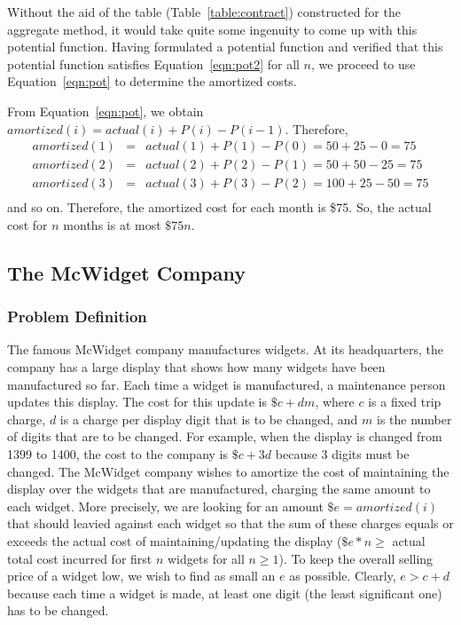 Without the aid of the table (Table~\ref{table:contract})
constructed for the aggregate method, it
would take quite some ingenuity to come up with this potential function.
Having formulated a potential function and verified that this
potential function satisfies Equation~\ref{eqn:pot2} for all $n$,
we proceed to use Equation~\ref{eqn:pot} to determine the amortized costs.

From Equation~\ref{eqn:pot}, we obtain
$amortized(i) = actual(i) + P(i) - P(i-1)$.
Therefore,
\begin{eqnarray*}
amortized(1) &=& actual(1) + P(1) - P(0) = 50 + 25 - 0 = 75\\
amortized(2) &=& actual(2) + P(2) - P(1) = 50 + 50 - 25 = 75\\
amortized(3) &=& actual(3) + P(3) - P(2) = 100 + 25 - 50 = 75\\
\end{eqnarray*}
and so on. Therefore, the amortized cost for each month is
\$75. So, the actual cost for
$n$ months is at most
$\$75n$.

\subsection{The McWidget Company}
\subsubsection*{Problem Definition}
The famous McWidget company manufactures widgets. At its headquarters, the
company has a large display that shows how many widgets have been manufactured
so far. Each time a widget is manufactured, a maintenance person updates
this display. The cost for this update is $\$c + dm$,
where $c$ is a fixed trip charge,
$d$ is a charge per display digit that is to be
changed, and $m$ is the number of digits that are
to be changed.  For example, when the display is changed from
1399 to
1400, the cost to the company is
$\$c + 3d$ because
3 digits must be changed.
The McWidget company wishes to amortize the cost of maintaining the display
over the widgets that are manufactured, charging the same amount to each widget.
More precisely, we are looking for an amount
$\$e = amortized(i)$ that should leavied against
each widget so that the sum of these charges equals or exceeds the
actual cost of maintaining/updating the display
($\$e*n \geq$ actual total cost incurred for first $n$ widgets
for all $n \geq 1$).
To keep the overall selling price of a widget low, we wish to find as small
an $e$ as possible.
Clearly,
$e > c + d$ because each time a widget is made, at least
one digit (the least significant one) has to be changed.

